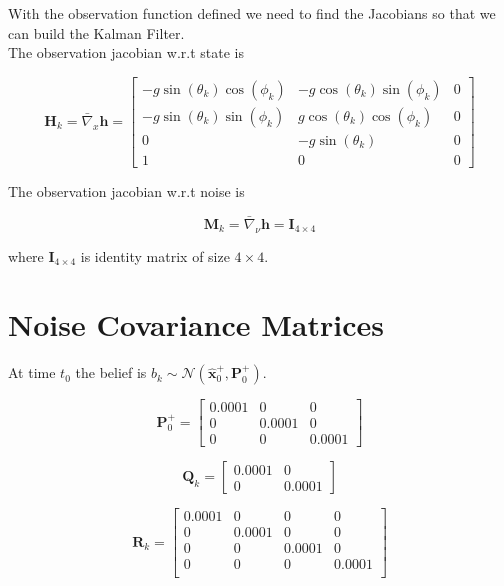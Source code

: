 \documentclass[12pt]{article}
\begin{document}
With the observation function defined we need to find the Jacobians so that we can build the Kalman Filter. \\

The observation jacobian w.r.t state is 

\begin{equation}
	\mathbf{H}_k = \bar{\nabla}_x\mathbf{h} =
	\begin{bmatrix}
	-g \sin(\theta_k) \cos(\phi_k) & -g \cos(\theta_k) \sin(\phi_k) & 0 \\
	-g \sin(\theta_k) \sin(\phi_k) & g \cos(\theta_k) \cos(\phi_k) & 0 \\
	 0 & -g \sin(\theta_k) & 0 \\
	 1 & 0 & 0
	\end{bmatrix}
\end{equation}

The observation jacobian w.r.t noise is 

\begin{equation}
	\mathbf{M}_k = \bar{\nabla}_{\nu}\mathbf{h} = \mathbf{I}_{4 \times 4}
\end{equation}

where $ \mathbf{I}_{4 \times 4}$ is identity matrix of size $4 \times 4$.

\section{Noise Covariance Matrices}

At time $t_0$ the belief is  $b_k \sim \mathcal{N}(\hat{\mathbf{x}}^{+}_0, \mathbf{P}^{+}_0)$.

\begin{equation}
\mathbf{P}^{+}_0 =
\begin{bmatrix}
0.0001 & 0 & 0 \\
0 & 0.0001 & 0 \\
0 & 0 & 0.0001
\end{bmatrix}
\end{equation}

\begin{equation}
\mathbf{Q}_k =
\begin{bmatrix}
0.0001 & 0\\
0 & 0.0001
\end{bmatrix}
\end{equation}

\begin{equation}
\mathbf{R}_k =
\begin{bmatrix}
0.0001 & 0 & 0 & 0\\
0 & 0.0001 & 0 & 0\\
0 & 0 & 0.0001 & 0\\
0 & 0 & 0 & 0.0001 \\
\end{bmatrix}
\end{equation}
\end{document}
